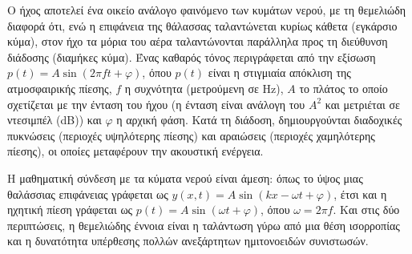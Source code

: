 \documentclass[a4paper, 11pt]{article}
\begin{document}
Ο ήχος αποτελεί ένα οικείο ανάλογο φαινόμενο των κυμάτων νερού, με τη
θεμελιώδη διαφορά ότι, ενώ η επιφάνεια της θάλασσας ταλαντώνεται κυρίως
κάθετα (εγκάρσιο κύμα), στον ήχο τα μόρια του αέρα ταλαντώνονται
παράλληλα προς τη διεύθυνση διάδοσης (διαμήκες κύμα). Ένας καθαρός τόνος
περιγράφεται από την εξίσωση \(p(t) = A \sin(2\pi f t + \varphi)\), όπου
\(p(t)\) είναι η στιγμιαία απόκλιση της ατμοσφαιρικής πίεσης, \(f\) η
συχνότητα (μετρούμενη σε Hz), \(A\) το πλάτος το οποίο σχετίζεται με την
ένταση του ήχου (η ένταση είναι ανάλογη του \(A^2\) και μετριέται σε
ντεσιμπέλ (dB)) και \(\varphi\) η αρχική φάση. Κατά τη διάδοση,
δημιουργούνται διαδοχικές πυκνώσεις (περιοχές υψηλότερης πίεσης) και
αραιώσεις (περιοχές χαμηλότερης πίεσης), οι οποίες μεταφέρουν την
ακουστική ενέργεια.

Η μαθηματική σύνδεση με τα κύματα νερού είναι άμεση: όπως το ύψος μιας
θαλάσσιας επιφάνειας γράφεται ως
\(y(x,t) = A\sin(kx - \omega t + \varphi)\), έτσι και η ηχητική πίεση
γράφεται ως \(p(t) = A\sin(\omega t + \varphi)\), όπου
\(\omega = 2\pi f\). Και στις δύο περιπτώσεις, η θεμελιώδης έννοια είναι
η ταλάντωση γύρω από μια θέση ισορροπίας και η δυνατότητα υπέρθεσης
πολλών ανεξάρτητων ημιτονοειδών συνιστωσών.
\end{document}
